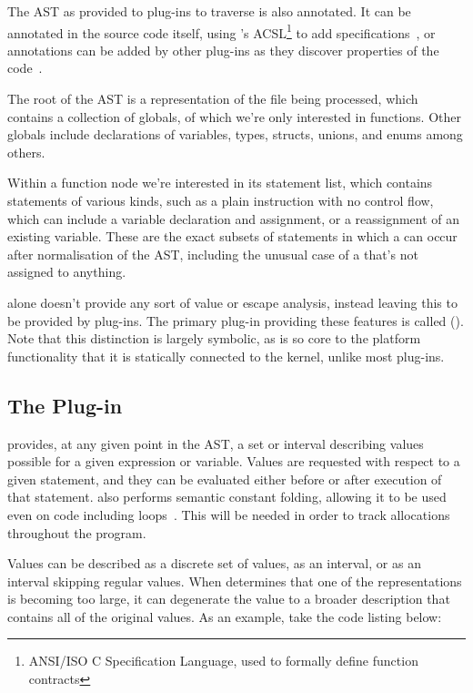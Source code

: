 The AST as provided to plug-ins to traverse is also annotated. It can be annotated in the source code itself, using 's ACSL\footnote{ANSI/ISO C Specification Language, used to formally define function contracts} to add specifications~\cite{framaacsl}, or annotations can be added by other plug-ins as they discover properties of the code~\cite{framaplug}.

The root of the AST is a representation of the file being processed, which contains a collection of globals, of which we're only interested in functions. Other globals include declarations of variables, types, structs, unions, and enums among others.

Within a function node we're interested in its statement list, which contains statements of various kinds, such as a plain instruction with no control flow, which can include a variable declaration and assignment, or a reassignment of an existing variable. These are the exact subsets of statements in which a \malloc{} can occur after normalisation of the AST, including the unusual case of a \malloc{} that's not assigned to anything.

 alone doesn't provide any sort of value or escape analysis, instead leaving this to be provided by plug-ins. The primary plug-in providing these features is called  (). Note that this distinction is largely symbolic, as  is so core to the platform functionality that it is statically connected to the  kernel, unlike most plug-ins.

\subsection{The  Plug-in}\label{EVA}

 provides, at any given point in the AST, a set or interval describing values possible for a given expression or variable. Values are requested with respect to a given statement, and they can be evaluated either before or after execution of that statement.  also performs semantic constant folding, allowing it to be used even on code including loops~\cite{framaeva}. This will be needed in order to track allocations throughout the program.

Values can be described as a discrete set of values, as an interval, or as an interval skipping regular values. When  determines that one of the representations is becoming too large, it can degenerate the value to a broader description that contains all of the original values. As an example, take the code listing below:

